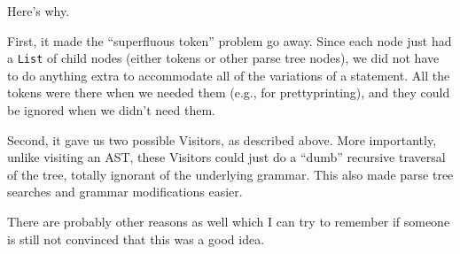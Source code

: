 Here's why.

First, it made the ``superfluous token'' problem go away.
Since each node just had a \texttt{List} of child nodes (either tokens or
other parse tree nodes), we did not have to do anything extra to accommodate
all of the variations of a statement.  All the tokens were there when we
needed them (e.g., for prettyprinting), and they could be ignored when we
didn't need them.

Second, it gave us two possible Visitors, as described above.  More
importantly, unlike visiting an AST, these Visitors could just do a ``dumb''
recursive traversal of the tree, totally ignorant of the underlying grammar.
This also made parse tree searches and grammar modifications easier.

There are probably other reasons as well which I can try to remember if
someone is still not convinced that this was a good idea.

